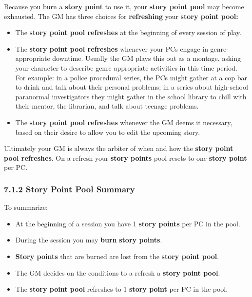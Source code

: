 \documentclass[
  11pt,
]{article}
\providecommand{\tightlist}{%
  \setlength{\itemsep}{0pt}\setlength{\parskip}{0pt}}
\begin{document}
Because you burn a \textbf{story point} to use it, your \textbf{story
point pool} may become exhausted. The GM has three choices for
\textbf{refreshing} your \textbf{story point pool:}

\begin{itemize}
\tightlist
\item
  The \textbf{story point pool refreshes} at the beginning of every
  session of play.
\item
  The \textbf{story point pool refreshes} whenever your PCs engage in
  genre-appropriate downtime. Usually the GM plays this out as a
  montage, asking your character to describe genre appropriate
  activities in this time period. For example: in a police procedural
  series, the PCs might gather at a cop bar to drink and talk about
  their personal problems; in a series about high-school paranormal
  investigators they might gather in the school library to chill with
  their mentor, the librarian, and talk about teenage problems.
\item
  The \textbf{story point pool refreshes} whenever the GM deems it
  necessary, based on their desire to allow you to edit the upcoming
  story.
\end{itemize}

Ultimately your GM is always the arbiter of when and how the
\textbf{story point pool refreshes}. On a refresh your \textbf{story
points} pool resets to one \textbf{story point} per PC.

\hypertarget{story-point-pool-summary}{%
\subsubsection{7.1.2 Story Point Pool
Summary}\label{story-point-pool-summary}}

To summarize:

\begin{itemize}
\tightlist
\item
  At the beginning of a session you have 1 \textbf{story points} per PC
  in the pool.
\item
  During the session you may \textbf{burn} \textbf{story points}.
\item
  \textbf{Story points} that are burned are lost from the \textbf{story
  point pool}.
\item
  The GM decides on the conditions to a refresh a \textbf{story point
  pool}.
\item
  The \textbf{story point pool} refreshes to 1 \textbf{story point} per
  PC in the pool.
\end{itemize}
\end{document}
